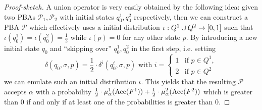 \begin{proof}[Proof-sketch]
  A union operator is very easily obtained by the following idea: given two
  \acp{PBA} $\mathcal{P}_{1},\mathcal{P}_{2}$ with initial states $q^{1}_{0},
  q^{2}_{0}$ respectively, then we can construct a \ac{PBA} $\mathcal{P}$ which
  effectively uses a initial distribution 
  $\iota:Q^{1}\cup Q^{2}\rightarrow\left[0,1\right]$ such that 
  $\iota(q^{1}_{0}) = \iota(q^{2}_{0}) = \frac{1}{2}$ while $\iota(p) = 0$ for
  any other state $p$. By introducing a new initial state $q_{0}$ and 
  \enquote{skipping over} $q^{1}_{0},q^{2}_{0}$ in the first step, i.e.
  setting
  \begin{equation*}
    \delta(q_{0},\sigma, p) = \frac{1}{2}\cdot\delta^{i}(q^{i}_{0},\sigma, p)
    \text{ with }
    i = \begin{cases}
      1&\text{if }p\in Q^{1},\\
      2&\text{if }p\in Q^{2}
    \end{cases}
  \end{equation*}
  we can emulate such an initial distribution $\iota$. This yields that the 
  resulting $\mathcal{P}$ accepts $\alpha$ with a probability
  $\frac{1}{2}\cdot\mu^{1}_{\alpha}(\operatorname{Acc}(F^{1})) + 
  \frac{1}{2}\cdot\mu^{2}_{\alpha}(\operatorname{Acc}(F^{2}))$ which is greater than $0$ if
  and only if at least one of the probabilities is greater than $0$.


\end{proof}
